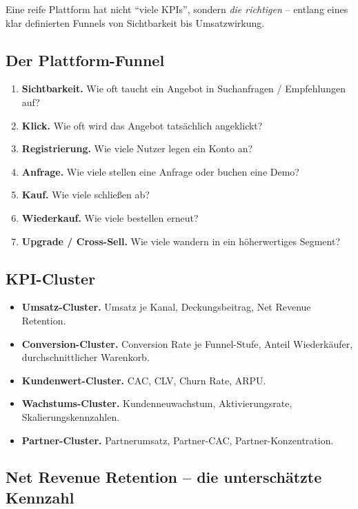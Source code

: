 \documentclass[11pt,a4paper,oneside]{article}
\newcommand{\fachbegriff}[1]{\textbf{#1}}
\begin{document}
Eine reife Plattform hat nicht ``viele KPIs'', sondern \emph{die richtigen} -- entlang eines klar definierten Funnels von Sichtbarkeit bis Umsatzwirkung.

\subsection{Der Plattform-Funnel}

\begin{enumerate}
  \item \fachbegriff{Sichtbarkeit.} Wie oft taucht ein Angebot in Suchanfragen / Empfehlungen auf?
  \item \fachbegriff{Klick.} Wie oft wird das Angebot tatsächlich angeklickt?
  \item \fachbegriff{Registrierung.} Wie viele Nutzer legen ein Konto an?
  \item \fachbegriff{Anfrage.} Wie viele stellen eine Anfrage oder buchen eine Demo?
  \item \fachbegriff{Kauf.} Wie viele schließen ab?
  \item \fachbegriff{Wiederkauf.} Wie viele bestellen erneut?
  \item \fachbegriff{Upgrade / Cross-Sell.} Wie viele wandern in ein höherwertiges Segment?
\end{enumerate}

\subsection{KPI-Cluster}

\begin{itemize}
  \item \textbf{Umsatz-Cluster.} Umsatz je Kanal, Deckungsbeitrag, Net Revenue Retention.
  \item \textbf{Conversion-Cluster.} Conversion Rate je Funnel-Stufe, Anteil Wiederkäufer, durchschnittlicher Warenkorb.
  \item \textbf{Kundenwert-Cluster.} CAC, CLV, Churn Rate, ARPU.
  \item \textbf{Wachstums-Cluster.} Kundenneuwachstum, Aktivierungsrate, Skalierungskennzahlen.
  \item \textbf{Partner-Cluster.} Partnerumsatz, Partner-CAC, Partner-Konzentration.
\end{itemize}

\subsection{Net Revenue Retention -- die unterschätzte Kennzahl}
\end{document}
